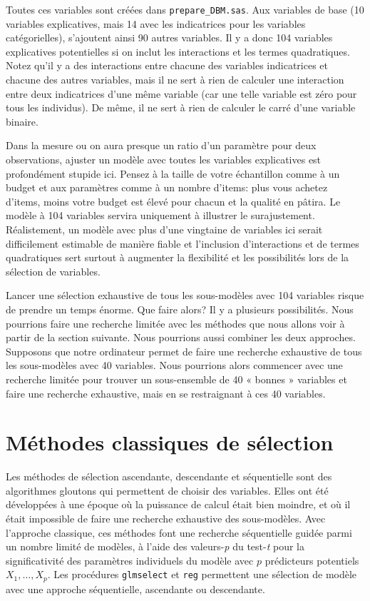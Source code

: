 \documentclass[
  11pt,
  letterpaper,
]{book}
\theoremstyle{definition}
\theoremstyle{definition}
\theoremstyle{definition}
\theoremstyle{remark}
\begin{document}
Toutes ces variables sont créées dans \texttt{prepare\_DBM.sas}. Aux variables de base (10 variables explicatives, mais 14 avec les indicatrices pour les variables catégorielles), s'ajoutent ainsi 90 autres variables. Il y a donc 104 variables explicatives potentielles si on inclut les interactions et les termes quadratiques. Notez qu'il y a des interactions entre chacune des variables indicatrices et chacune des autres variables, mais il ne sert à rien de calculer une interaction entre deux indicatrices d'une même variable (car une telle variable est zéro pour tous les individus). De même, il ne sert à rien de calculer le carré d'une variable binaire.

Dans la mesure ou on aura presque un ratio d'un paramètre pour deux observations, ajuster un modèle avec toutes les variables explicatives est profondément stupide ici. Pensez à la taille de votre échantillon comme à un budget et aux paramètres comme à un nombre d'items: plus vous achetez d'items, moins votre budget est élevé pour chacun et la qualité en pâtira. Le modèle à 104 variables servira uniquement à illustrer le surajustement. Réalistement, un modèle avec plus d'une vingtaine de variables ici serait difficilement estimable de manière fiable et l'inclusion d'interactions et de termes quadratiques sert surtout à augmenter la flexibilité et les possibilités lors de la sélection de variables.

Lancer une sélection exhaustive de tous les sous-modèles avec 104 variables risque de prendre un temps énorme. Que faire alors? Il y a plusieurs possibilités. Nous pourrions faire une recherche limitée avec les méthodes que nous allons voir à partir de la section suivante. Nous pourrions aussi combiner les deux approches. Supposons que notre ordinateur permet de faire une recherche exhaustive de tous les sous-modèles avec 40 variables. Nous pourrions alors commencer avec une recherche limitée pour trouver un sous-ensemble de 40 « bonnes » variables et faire une recherche exhaustive, mais en se restraignant à ces 40 variables.

\hypertarget{muxe9thodes-classiques-de-suxe9lection}{%
\section{Méthodes classiques de sélection}\label{muxe9thodes-classiques-de-suxe9lection}}

Les méthodes de sélection ascendante, descendante et séquentielle sont des algorithmes gloutons qui permettent de choisir des variables. Elles ont été développées à une époque où la puissance de calcul était bien moindre, et où il était impossible de faire une recherche exhaustive des sous-modèles. Avec l'approche classique, ces méthodes font une recherche séquentielle guidée parmi un nombre limité de modèles, à l'aide des valeurs-\emph{p} du test-\emph{t} pour la significativité des paramètres individuels du modèle avec \(p\) prédicteurs potentiels \(X_1,\ldots, X_p\). Les procédures \texttt{glmselect} et \texttt{reg} permettent une sélection de modèle avec une approche séquentielle, ascendante ou descendante.
\end{document}

